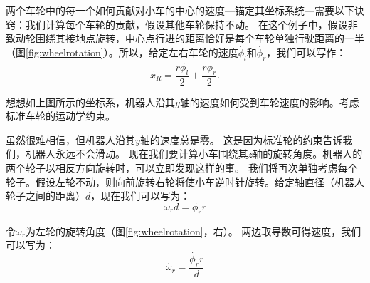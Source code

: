 两个车轮中的每一个如何贡献对小车的中心的速度---锚定其坐标系统---需要以下诀窍：我们计算每个车轮的贡献，假设其他车轮保持不动。 在这个例子中，假设非致动轮围绕其接地点旋转，中心点行进的距离恰好是每个车轮单独行驶距离的一半（图\ref{fig:wheelrotation}）。所以，给定左右车轮的速度$\dot{\phi_l}$和$\dot{\phi_r}$，我们可以写作：
\begin{equation}
\dot{x_R}=\frac{r\dot{\phi_l}}{2}+\frac{r\dot{\phi_r}}{2}.
\end{equation}


\begin{framed}
想想如上图所示的坐标系，机器人沿其$y$轴的速度如何受到车轮速度的影响。考虑标准车轮的运动学约束。
\end{framed}


虽然很难相信，但机器人沿其$y$轴的速度总是零。 这是因为标准轮的约束告诉我们，机器人永远不会滑动。 现在我们要计算小车围绕其$z$轴的旋转角度。机器人的两个轮子以相反方向旋转时，可以立即发现这样的事。 我们将再次单独考虑每个轮子。假设左轮不动，则向前旋转右轮将使小车逆时针旋转。给定轴直径（机器人轮子之间的距离）$ d $，现在我们可以写为：
\begin{equation}
\omega_r d = \phi_r r
\end{equation}

令$\omega_r$为左轮的旋转角度（图\ref {fig:wheelrotation}，右）。 两边取导数可得速度，我们可以写为：
\begin{equation}
\dot{\omega_r} = \frac{\dot{\phi_r} r}{d}
\end{equation}

